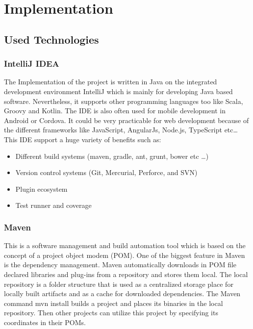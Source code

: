 \chapter{Implementation}
\lstset{language=NoBeardAsm}
\section{Used Technologies}
\subsection{IntelliJ IDEA} 
The Implementation of the project is written in Java on the integrated development environment IntelliJ which is mainly for developing Java based software. Nevertheless, it supports other programming languages too like Scala, Groovy and Kotlin. The IDE is also often used for mobile development in Android or Cordova. It could be very practicable for web development because of the different frameworks like JavaScript, AngularJs, Node.js, TypeScript etc…
This IDE support a huge variety of benefits such as:
\begin{itemize}
\item Different build systems (maven, gradle, ant, grunt, bower etc \ldots)
\item Version control systems (Git, Mercurial, Perforce, and SVN)
\item Plugin ecosystem
\item Test runner and coverage
\end{itemize}
\subsection{Maven} \label{sec:maven}
This is a software management and build automation tool which is based on the concept of a project object modem (POM). One of the biggest feature in Maven is the dependency management. Maven automatically downloads in POM file declared libraries and plug-ins from a repository and stores them local. The local repository is a folder structure that is used as a centralized storage place for locally built artifacts and as a cache for downloaded dependencies. The Maven command mvn install builds a project and places its binaries in the local repository. Then other projects can utilize this project by specifying its coordinates in their POMs.
